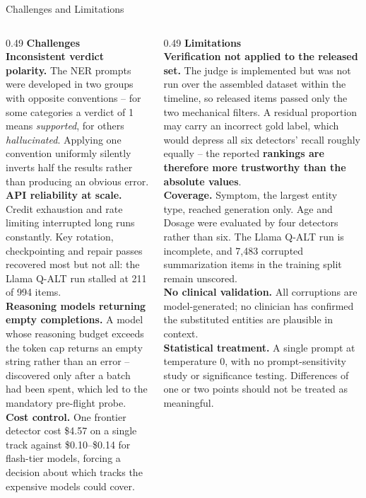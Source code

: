 \documentclass[aspectratio=169,11pt]{beamer}
\begin{document}
\begin{frame}[shrink=12]{Challenges and Limitations}
\vspace{-2mm}
{\footnotesize
\begin{columns}[T]
\begin{column}{0.49\textwidth}
\textbf{Challenges}\\[1.5mm]
\textbf{Inconsistent verdict polarity.} The NER prompts were developed in two groups with opposite conventions -- for some categories a verdict of 1 means \emph{supported}, for others \emph{hallucinated}. Applying one convention uniformly silently inverts half the results rather than producing an obvious error.\\[1.5mm]
\textbf{API reliability at scale.} Credit exhaustion and rate limiting interrupted long runs constantly. Key rotation, checkpointing and repair passes recovered most but not all: the Llama Q-ALT run stalled at 211 of 994 items.\\[1.5mm]
\textbf{Reasoning models returning empty completions.} A model whose reasoning budget exceeds the token cap returns an empty string rather than an error -- discovered only after a batch had been spent, which led to the mandatory pre-flight probe.\\[1.5mm]
\textbf{Cost control.} One frontier detector cost \$4.57 on a single track against \$0.10--\$0.14 for flash-tier models, forcing a decision about which tracks the expensive models could cover.
\end{column}
\begin{column}{0.49\textwidth}
\textbf{Limitations}\\[1.5mm]
\textbf{Verification not applied to the released set.} The judge is implemented but was not run over the assembled dataset within the timeline, so released items passed only the two mechanical filters. A residual proportion may carry an incorrect gold label, which would depress all six detectors' recall roughly equally -- the reported \textbf{rankings are therefore more trustworthy than the absolute values}.\\[1.5mm]
\textbf{Coverage.} Symptom, the largest entity type, reached generation only. Age and Dosage were evaluated by four detectors rather than six. The Llama Q-ALT run is incomplete, and 7,483 corrupted summarization items in the training split remain unscored.\\[1.5mm]
\textbf{No clinical validation.} All corruptions are model-generated; no clinician has confirmed the substituted entities are plausible in context.\\[1.5mm]
\textbf{Statistical treatment.} A single prompt at temperature 0, with no prompt-sensitivity study or significance testing. Differences of one or two points should not be treated as meaningful.
\end{column}
\end{columns}
}
\end{frame}
\end{document}
